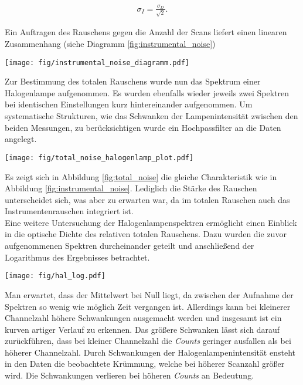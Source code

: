 \documentclass[12pt, a4paper, bibliography=totoc]{scrartcl}
\begin{document}
\begin{multicols}{2}
\begin{align}
\sigma_{I} = \frac{\sigma_D}{\sqrt{2}}.\label{eq:instrumental_noise}
\end{align}

Ein Auftragen des Rauschens gegen die Anzahl der Scans liefert einen linearen Zusammenhang (siehe Diagramm \ref{fig:instrumental_noise})

\begin{center}
	\texttt{[image: fig/instrumental\_noise\_diagramm.pdf]}
	\label{fig:instrumental_noise}
\end{center}  

Zur Bestimmung des totalen Rauschens wurde nun das Spektrum einer Halogenlampe aufgenommen.
Es wurden ebenfalls wieder jeweils zwei Spektren bei identischen Einstellungen kurz hintereinander aufgenommen. 
Um systematische Strukturen, wie das Schwanken der Lampenintensität zwischen den beiden Messungen, zu berücksichtigen wurde ein Hochpassfilter an die Daten angelegt.

\begin{center}
	\texttt{[image: fig/total\_noise\_halogenlamp\_plot.pdf]}
	\label{fig:total_noise}
\end{center}  

Es zeigt sich in Abbildung \ref{fig:total_noise} die gleiche Charakteristik wie in Abbildung \ref{fig:instrumental_noise}. Lediglich die Stärke des Rauschen unterscheidet sich, was aber zu erwarten war, da im totalen Rauschen auch das Instrumentenrauschen integriert ist.
\\
Eine weitere Untersuchung der Halogenlampenspektren ermöglicht einen Einblick in die optische Dichte des relativen totalen Rauschens. Dazu wurden die zuvor aufgenommenen Spektren durcheinander geteilt und anschließend der Logarithmus des Ergebnisses betrachtet.


\begin{center}
    \texttt{[image: fig/hal\_log.pdf]}
    \label{fig:hal_log}
\end{center}


Man erwartet, dass der Mittelwert bei Null liegt, da zwischen der Aufnahme der Spektren so wenig wie möglich Zeit vergangen ist. Allerdings kann bei kleinerer Channelzahl höhere Schwankungen ausgemacht werden und insgesamt ist ein kurven artiger Verlauf zu erkennen.
Das größere Schwanken lässt sich darauf zurückführen, dass bei kleiner Channelzahl die \textit{Counts} geringer ausfallen als bei höherer Channelzahl.
Durch Schwankungen der Halogenlampenintensität ensteht in den Daten die beobachtete Krümmung, welche bei höherer Scanzahl größer wird. Die Schwankungen verlieren bei höheren \textit{Counts} an Bedeutung.


\end{multicols}
\end{document}
